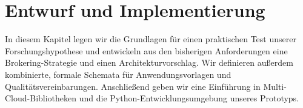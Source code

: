 \chapter{Entwurf und Implementierung}
\label{cha:implementierung}

In diesem Kapitel legen wir die Grundlagen für einen praktischen Test unserer Forschungshypothese und entwickeln aus den bisherigen Anforderungen eine Brokering-Strategie und einen Architekturvorschlag. Wir definieren außerdem kombinierte, formale Schemata für Anwendungsvorlagen und Qualitätsvereinbarungen. Anschließend geben wir eine Einführung in Multi-Cloud-Bibliotheken und die Python-Entwicklungsumgebung unseres Prototyps.









